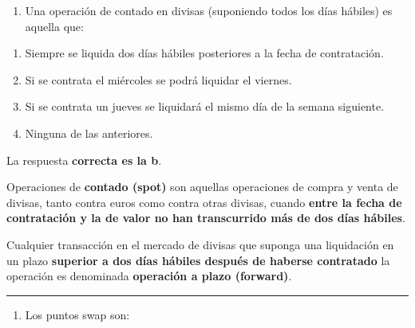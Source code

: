 \documentclass[
  letterpaper,
  DIV=11,
  numbers=noendperiod]{scrreprt}
\providecommand{\tightlist}{%
  \setlength{\itemsep}{0pt}\setlength{\parskip}{0pt}}\usepackage{longtable,booktabs,array}
\begin{document}
\begin{enumerate}
\def\labelenumi{\arabic{enumi}.}
\setcounter{enumi}{25}
\tightlist
\item
  Una operación de contado en divisas (suponiendo todos los días
  hábiles) es aquella que:
\end{enumerate}

\begin{enumerate}
\def\labelenumi{\alph{enumi}.}
\item
  Siempre se liquida dos días hábiles posteriores a la fecha de
  contratación.
\item
  Si se contrata el miércoles se podrá liquidar el viernes.
\item
  Si se contrata un jueves se liquidará el mismo día de la semana
  siguiente.
\item
  Ninguna de las anteriores.
\end{enumerate}

\begin{tcolorbox}[enhanced jigsaw, left=2mm, opacityback=0, colback=white, breakable, arc=.35mm, bottomrule=.15mm, rightrule=.15mm, toprule=.15mm, leftrule=.75mm, colframe=quarto-callout-tip-color-frame]
\begin{minipage}[t]{5.5mm}
\textcolor{quarto-callout-tip-color}{\faLightbulb}
\end{minipage}%
\begin{minipage}[t]{\textwidth - 5.5mm}

La respuesta \textbf{correcta es la b}.

Operaciones de \textbf{contado (spot)} son aquellas operaciones de
compra y venta de divisas, tanto contra euros como contra otras divisas,
cuando \textbf{entre la fecha de contratación y la de valor no han
transcurrido más de dos días hábiles}.

Cualquier transacción en el mercado de divisas que suponga una
liquidación en un plazo \textbf{superior a dos días hábiles después de
haberse contratado} la operación es denominada \textbf{operación a plazo
(forward)}.

\end{minipage}%
\end{tcolorbox}

\begin{center}\rule{0.5\linewidth}{0.5pt}\end{center}

\begin{enumerate}
\def\labelenumi{\arabic{enumi}.}
\setcounter{enumi}{26}
\tightlist
\item
  Los puntos swap son:
\end{enumerate}
\end{document}
